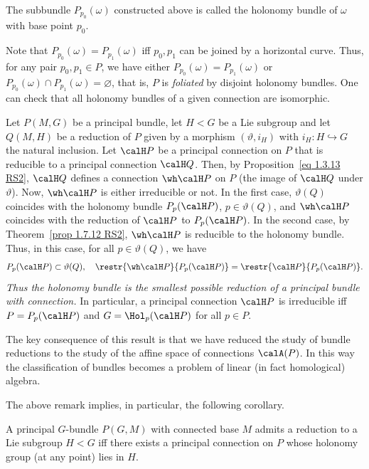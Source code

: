 \begin{defn}
    The subbundle $P_{p_0}(\omega)$ constructed above is called the holonomy bundle of $\omega$ with base point $p_0$.
\end{defn}

Note that $P_{p_0}(\omega)=P_{p_1}(\omega)$ iff $p_0,p_1$ can be joined by a horizontal curve. Thus, for any pair $p_0,p_1\in P$, we have either $P_{p_0}(\omega)=P_{p_1}(\omega)$ or $P_{p_0}(\omega)\cap P_{p_1}(\omega)=\varnothing$, that is, $P$ is \emph{foliated} by disjoint holonomy bundles. One can check that all holonomy bundles of a given connection are isomorphic.

\begin{rem}\label{rem 1.7.14 RS2}
    Let $P(M,G)$ be a principal bundle, let $H<G$ be a Lie subgroup and let $Q(M,H)$ be a reduction of $P$ given by a morphism $(\vartheta,i_H)$ with $i_H:H\hookrightarrow G$ the natural inclusion. Let $\calH P$ be a principal connection on $P$ that is reducible to a principal connection $\calH Q$. Then, by Proposition~\ref{eq 1.3.13 RS2}, $\calH Q$ defines a connection $\wh\calH P$ on $P$ (the image of $\calH Q$ under $\vartheta$). Now, $\wh\calH P$ is either irreducible or not. In the first case, $\vartheta(Q)$ coincides with the holonomy bundle $P_p(\calH P)$, $p\in\vartheta(Q)$, and $\wh\calH P$ coincides with the reduction of $\calH P$ to $P_p(\calH P)$. In the second case, by Theorem~\ref{prop 1.7.12 RS2}, $\wh\calH P$ is reducible to the holonomy bundle. Thus, in this case, for all $p\in\vartheta(Q)$, we have
    \[P_p(\calH P)\subset\vartheta(Q),\quad \restr{\wh\calH P}{P_p(\calH P)}=\restr{\calH P}{P_p(\calH P)}.\]
    \emph{Thus the holonomy bundle is the smallest possible reduction of a principal bundle with connection.} In particular, a principal connection $\calH P$ is irreducible iff $P=P_p(\calH P)$ and $G=\Hol_p(\calH P)$ for all $p\in P$.

    The key consequence of this result is that we have reduced the study of bundle reductions to the study of the affine space of connections $\calA(P)$. In this way the classification of bundles becomes a problem of linear (in fact homological) algebra.
\end{rem} 

The above remark implies, in particular, the following corollary.

\begin{cor}
    A principal $G$-bundle $P(G,M)$ with connected base $M$ admits a reduction to a Lie subgroup $H<G$ iff there exists a principal connection on $P$ whose holonomy group (at any point) lies in $H$.
\end{cor}


